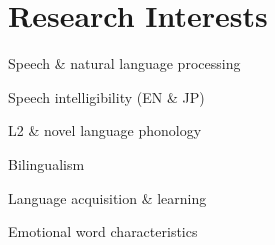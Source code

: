 \documentclass[letterpaper]{deedy-resume} %
\begin{document}

\lastupdated %


\section{Research Interests}
\vspace{\topsep} %
\begin{tightitemize}
\item Speech \& natural language processing 
\item Speech intelligibility (EN \& JP) 
\item L2 \& novel language phonology 
\item Bilingualism 
\item Language acquisition \& learning 
\item Emotional word characteristics
\end{tightitemize}
\sectionspace

\end{document}
